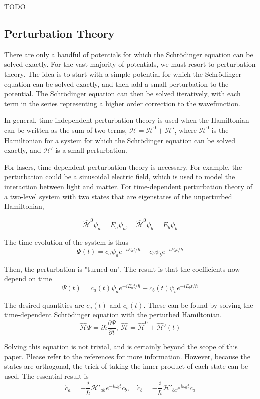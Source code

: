 \documentclass{article}
\newcommand{\p}{\partial}
\renewcommand{\H}{\mathcal{H}}
\begin{document}
TODO


\subsection*{Perturbation Theory}


There are only a handful of potentials for which the Schr\"odinger equation can be solved exactly. For the vast majority of potentials, we must resort to perturbation theory. The idea is to start with a simple potential for which the Schr\"odinger equation can be solved exactly, and then add a small perturbation to the potential. The Schr\"odinger equation can then be solved iteratively, with each term in the series representing a higher order correction to the wavefunction. 

In general, time-independent perturbation theory is used when the Hamiltonian can be written as the sum of two terms, $\H = \H^0 + \H'$, where $\H^0$ is the Hamiltonian for a system for which the Schr\"odinger equation can be solved exactly, and $\H'$ is a small perturbation.

For lasers, time-dependent perturbation theory is necessary. For example, the perturbation could be a sinusoidal electric field, which is used to model the interaction between light and matter. For time-dependent perturbation theory of a two-level system with two states that are eigenstates of the unperturbed Hamiltonian,

\[ \hat{\H}^0\psi_a = E_a\psi_a,\quad \hat{\H}^0\psi_b = E_b\psi_b \]

The time evolution of the system is thus 
\[ \Psi(t) = c_a\psi_ae^{-iE_at/\hbar} + c_b\psi_be^{-iE_bt/\hbar} \]

Then, the perturbation is "turned on". The result is that the coefficients now depend on time 
\[ \Psi(t) = c_a(t)\psi_ae^{-iE_at/\hbar} + c_b(t)\psi_be^{-iE_bt/\hbar} \]

The desired quantities are $c_a(t)$ and $c_b(t)$. These can be found by solving the time-dependent Schr\"odinger equation with the perturbed Hamiltonian. 
\[ \hat{\H}\Psi = i\hbar\frac{\p\Psi}{\p t},\ \hat{\H} = \hat{\H}^0 + \hat{\H}'(t) \]

Solving this equation is not trivial, and is certainly beyond the scope of this paper. Please refer to the references for more information. However, because the states are orthogonal, the trick of taking the inner product of each state can be used. The essential result is 
\begin{equation}
     \dot{c}_a = -\frac{i}{\hbar}\H'_{ab}e^{-i\omega_0t}c_b,\quad \dot{c}_b = -\frac{i}{\hbar}\H'_{ba}e^{i\omega_0t}c_a 
\end{equation}
\end{document}
